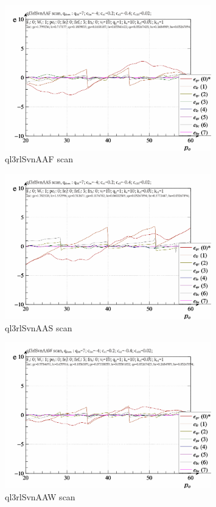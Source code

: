 \documentclass[a4paper,10pt]{article}
\begin{document}
\begin{figure}[htb!]
  \centerline{
    \includegraphics[width=0.8\textwidth]{qls-p_p_e_ql3rlSvnAAF_scan.png}
  }
  \caption{ql3rlSvnAAF scan}
  \label{atu:f:ql3rlSvnAAF_scan}
\end{figure}

\begin{figure}[htb!]
  \centerline{
    \includegraphics[width=0.8\textwidth]{qls-p_p_e_ql3rlSvnAAS_scan.png}
  }
  \caption{ql3rlSvnAAS scan}
  \label{atu:f:ql3rlSvnAAS_scan}
\end{figure}

\begin{figure}[htb!]
  \centerline{
    \includegraphics[width=0.8\textwidth]{qls-p_p_e_ql3rlSvnAAW_scan.png}
  }
  \caption{ql3rlSvnAAW scan}
  \label{atu:f:ql3rlSvnAAW_scan}
\end{figure}
\end{document}
